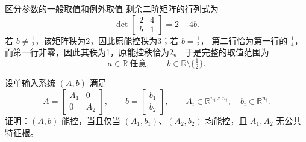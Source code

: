 \documentclass[11pt]{article}
\begin{document}
\begin{solution}
\begin{proofstep}{区分参数的一般取值和例外取值}
剩余二阶矩阵的行列式为
\[
\det\begin{bmatrix}2&4\\b&1\end{bmatrix}=2-4b.
\]
若 $b\ne\tfrac12$，该矩阵秩为2，因此原能控秩为3；若 $b=\tfrac12$，
第二行恰为第一行的 $\tfrac14$，而第一行非零，因此其秩为1，原能控秩恰为2。
于是完整的取值范围为
\[
\boxed{a\in\mathbb R\ \text{任意},\qquad b\in\mathbb R\setminus\{\tfrac12\}.}
\]
\end{proofstep}
\end{solution}

\begin{problem}[原题 9]
设单输入系统 $(A,b)$ 满足
\[
A=\begin{bmatrix}A_1&0\\0&A_2\end{bmatrix},\qquad
b=\begin{bmatrix}b_1\\b_2\end{bmatrix},\qquad
A_i\in\mathbb R^{n_i\times n_i},\quad b_i\in\mathbb R^{n_i}.
\]
证明：$(A,b)$ 能控，当且仅当 $(A_1,b_1)$、$(A_2,b_2)$ 均能控，且 $A_1,A_2$ 无公共特征根。
\end{problem}
\end{document}
